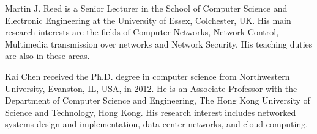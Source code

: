 \documentclass[10pt,journal,compsoc]{IEEEtran}
\begin{document}

\begin{IEEEbiography}
{Martin J. Reed} is a Senior Lecturer in the School of Computer Science and Electronic Engineering at the University of Essex, Colchester, UK. His main research interests are the fields of Computer Networks, Network Control, Multimedia transmission over networks and Network Security. His teaching duties are also in these areas.
\end{IEEEbiography}

\begin{IEEEbiography}
{Kai Chen} received the Ph.D. degree in computer science from Northwestern University, Evanston, IL, USA, in 2012. He is an Associate Professor with the Department of Computer Science and Engineering, The Hong Kong University of Science and Technology, Hong Kong. His research interest includes networked systems design and implementation, data center networks, and cloud computing.
\end{IEEEbiography}
\end{document}
